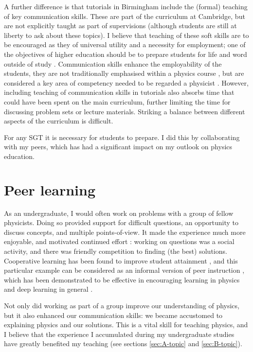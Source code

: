 A further difference is that tutorials in Birmingham include the (formal) teaching of key communication skills. These are part of the curriculum at Cambridge, but are not explicitly taught as part of supervisions (although students are still at liberty to ask about these topics). I believe that teaching of these soft skills are to be encouraged as they of universal utility and a necessity for employment; one of the objectives of higher education should be to prepare students for life and word outside of study \citep{Fallows2000,Harvey2000}. Communication skills enhance the employability of the students, they are not traditionally emphasised within a physics course \citep[cf.][]{Sharma2007}, but are considered a key area of competency needed to be regarded a physicist \citep{Gonsalves2014a}. However, including teaching of communication skills in tutorials also absorbs time that could have been spent on the main curriculum, further limiting the time for discussing problem sets or lecture materials. Striking a balance between different aspects of the curriculum is difficult.

For any SGT it is necessary for students to prepare. I did this by collaborating with my peers, which has had a significant impact on my outlook on physics education.

\section{Peer learning}\label{sec:peer}

As an undergraduate, I would often work on problems with a group of fellow physicists. Doing so provided support for difficult questions, an opportunity to discuss concepts, and multiple points-of-view. It made the experience much more enjoyable, and motivated continued effort \citep{Roth1994,Springer1999}: working on questions was a social activity, and there was friendly competition to finding (the best) solutions. Cooperative learning has been found to improve student attainment \citep{Qin1995,Cabrera2002}, and this particular example can be considered as an informal version of peer instruction \citep{Roth1994}, which has been demonstrated to be effective in encouraging learning in physics \citep{Springer1999,Crouch2001,Pilzer2001,Miller2006} and deep learning in general \citep{Marton1976,Wilson2010}.

Not only did working as part of a group improve our understanding of physics, but it also enhanced our communication skills: we became accustomed to explaining physics and our solutions. This is a vital skill for teaching physics, and I believe that the experience I accumulated during my undergraduate studies have greatly benefited my teaching (see sections \ref{sec:A-topic} and \ref{sec:B-topic}).

